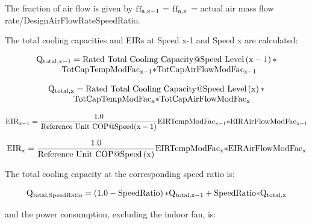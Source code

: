 The fraction of air flow is given by \({\rm{f}}{{\rm{f}}_{{\rm{a}},{\rm{x}} - 1}}\) = \({\rm{f}}{{\rm{f}}_{{\rm{a}},{\rm{x}}}}\) = actual air mass flow rate/DesignAirFlowRateSpeedRatio.

The total cooling capacities and EIRs at Speed x-1 and Speed x are calculated:

\begin{equation}
  \begin{array}{l}
    \rm{Q}_{\rm{total},\rm{x} - 1} = \rm{Rated~Total~Cooling~Capacity} @ \rm{Speed~Level} \left( \rm{x} - 1 \right) \rm{*} \\
    \quad \quad \quad \rm{TotCapTempModFa} \rm{c}_{\rm{x} - 1} \rm{*TotCapAirFlowModFa} \rm{c}_{\rm{x} - 1}
  \end{array}
\end{equation}

\begin{equation}
  \begin{array}{l}
    \rm{Q}_{\rm{total},\rm{x}} = \rm{Rated~Total~Cooling~Capacity} @ \rm{Speed~Level} \left( \rm{x} \right) \rm{*} \\
    \quad \quad \quad \rm{TotCapTempModFa} \rm{c}_{\rm{x}} \rm{*TotCapAirFlowModFa} \rm{c}_{\rm{x}}
  \end{array}
\end{equation}

\begin{equation}
{\rm{EI}}{{\rm{R}}_{{\rm{x}} - 1}} = \frac{{1.0}}{{{\rm{Reference~Unit~COP}}@{\rm{Speed}}({\rm{x}} - 1)}}{\rm{EIRTempModFa}}{{\rm{c}}_{{\rm{x}} - 1}}{\rm{*EIRAirFlowModFa}}{{\rm{c}}_{{\rm{x}} - 1}}
\end{equation}

\begin{equation}
{\rm{EI}}{{\rm{R}}_{\rm{x}}} = \frac{{1.0}}{{{\rm{Reference~Unit~COP}}@{\rm{Speed}}\left( {\rm{x}} \right)}}{\rm{EIRTempModFa}}{{\rm{c}}_{\rm{x}}}{\rm{*EIRAirFlowModFa}}{{\rm{c}}_{\rm{x}}}
\end{equation}

The total cooling capacity at the corresponding speed ratio is:

\begin{equation}
{{\rm{Q}}_{{\rm{total}},{\rm{SpeedRatio}}}} = \left( {1.0 - {\rm{SpeedRatio}}} \right){\rm{*}}{{\rm{Q}}_{{\rm{total}},{\rm{x}} - 1}} + {\rm{SpeedRatio*}}{{\rm{Q}}_{{\rm{total}},{\rm{x}}}}
\end{equation}

and the power consumption, excluding the indoor fan, is:

